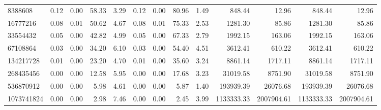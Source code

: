 \begin{tabular}{lrrrrrrrrrrrr}
8388608 & 0.12 & 0.00 & 58.33 & 3.29 & 0.12 & 0.00 & 80.96 & 1.49 & 848.44 & 12.96 & 848.44 & 12.96 \\
16777216 & 0.08 & 0.01 & 50.62 & 4.67 & 0.08 & 0.01 & 75.33 & 2.53 & 1281.30 & 85.86 & 1281.30 & 85.86 \\
33554432 & 0.05 & 0.00 & 42.82 & 4.99 & 0.05 & 0.00 & 67.33 & 2.79 & 1992.15 & 163.06 & 1992.15 & 163.06 \\
67108864 & 0.03 & 0.00 & 34.20 & 6.10 & 0.03 & 0.00 & 54.40 & 4.51 & 3612.41 & 610.22 & 3612.41 & 610.22 \\
134217728 & 0.01 & 0.00 & 23.20 & 4.70 & 0.01 & 0.00 & 35.60 & 3.24 & 8861.14 & 1717.11 & 8861.14 & 1717.11 \\
268435456 & 0.00 & 0.00 & 12.58 & 5.95 & 0.00 & 0.00 & 17.68 & 3.23 & 31019.58 & 8751.90 & 31019.58 & 8751.90 \\
536870912 & 0.00 & 0.00 & 5.98 & 4.61 & 0.00 & 0.00 & 5.87 & 1.40 & 193939.39 & 26076.68 & 193939.39 & 26076.68 \\
1073741824 & 0.00 & 0.00 & 2.98 & 7.46 & 0.00 & 0.00 & 2.45 & 3.99 & 1133333.33 & 2007904.61 & 1133333.33 & 2007904.61 \\
\bottomrule
\end{tabular}

